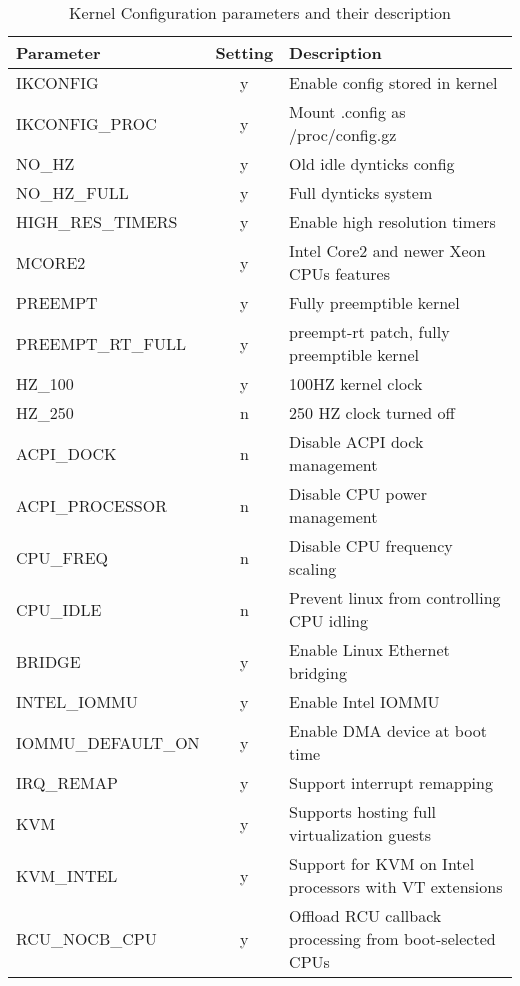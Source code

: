 \begin{table}
    \centering
    \caption{Kernel Configuration parameters and their description}
    \label{tab:kernel_configuration}
\begin{tabular}{l|c|p{8cm}|}
\hline
Parameter & Setting & Description \\
\hline \hline
IKCONFIG & y          &   Enable config stored in kernel \\
IKCONFIG\_PROC & y    &   Mount .config as /proc/config.gz \\
NO\_HZ & y            &   Old idle dynticks config \\
NO\_HZ\_FULL & y      &   Full dynticks system \\
HIGH\_RES\_TIMERS & y &   Enable high resolution timers\\
MCORE2 & y            &   Intel Core2 and newer Xeon CPUs features\\
PREEMPT & y           &   Fully preemptible kernel \\
PREEMPT\_RT\_FULL & y &   preempt-rt patch, fully preemptible kernel \\
HZ\_100 & y           &   100HZ kernel clock \\
HZ\_250 & n           &   250 HZ clock turned off \\
ACPI\_DOCK & n        &   Disable ACPI dock management \\
ACPI\_PROCESSOR & n   &   Disable CPU power management \\
CPU\_FREQ & n         &   Disable CPU frequency scaling \\
CPU\_IDLE & n         &   Prevent linux from controlling CPU idling \\
BRIDGE & y            &   Enable Linux Ethernet bridging \\
INTEL\_IOMMU & y      &   Enable Intel IOMMU  \\
IOMMU\_DEFAULT\_ON & y&   Enable DMA device at boot time \\
IRQ\_REMAP & y        &   Support interrupt remapping \\
KVM & y               &   Supports hosting full virtualization guests \\
KVM\_INTEL & y        &   Support for KVM on Intel processors with VT extensions \\
RCU\_NOCB\_CPU & y    &   Offload RCU callback processing from boot-selected CPUs\\
\hline
\end{tabular}
\end{table}
